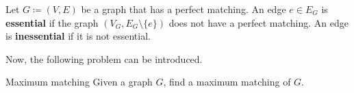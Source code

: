 \begin{definition}
\label{def:essential}
    Let \(G \coloneqq (V, E)\) be a graph that has a perfect matching.
    An edge \(e \in E_G\) is \textbf{essential} if the graph \((V_G, E_G \setminus \{e\})\) does not have a perfect matching.
    An edge is \textbf{inessential} if it is not essential.
\end{definition}
\noindent
Now, the following problem can be introduced.
\newpage
\begin{problem}{Maximum matching}
\label{prob:max_matching}
	Given a graph \(G\), find a maximum matching of \(G\).
\end{problem}